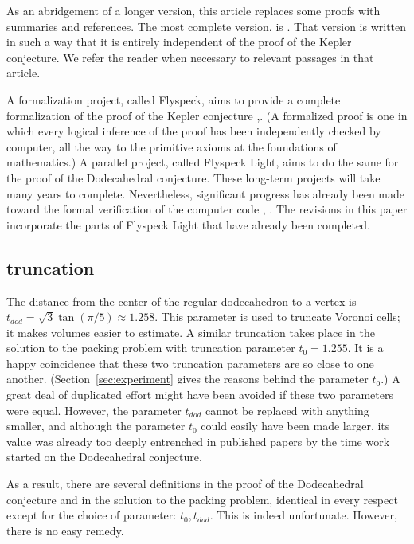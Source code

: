 As an abridgement of a longer version, this article replaces 
some proofs with summaries and references.  The most complete version.
is \cite{arx}.  That version is written in such a way that it is
entirely independent of the proof of the Kepler conjecture. 
We refer the reader when necessary to relevant
passages in that article.

A formalization project, called Flyspeck, aims to
provide a complete formalization of the proof of the Kepler conjecture \cite{fly},\cite{Fl}.  (A formalized proof is one in which every logical inference of the proof has been independently checked by computer, all the way to the primitive axioms at the foundations of mathematics.)
A parallel project, called Flyspeck Light, aims to do the same
for the proof of the Dodecahedral conjecture.  These long-term projects
will take many years to complete.  Nevertheless, significant progress
has already been made toward the formal verification of the computer
code \cite{BN}, \cite{Ob}.   The revisions in this paper 
incorporate the parts of Flyspeck Light that have
already been completed.

\subsection{truncation}

The distance from the center of the regular dodecahedron to a vertex is
$t_{dod}=\sqrt{3}\tan(\pi/5)\approx 1.258$.   This parameter is used to truncate
Voronoi cells; it makes  volumes easier to estimate.  A similar truncation
takes place in the solution to the packing problem with truncation parameter
$t_0 = 1.255$.  It is a happy coincidence that these two truncation parameters 
are so close to one another.  (Section~\ref{sec:experiment} 
gives the reasons behind the parameter $t_0$.)  A great deal of duplicated effort
might have been avoided if these two parameters were equal.  However, the parameter
$t_{dod}$ cannot be replaced with anything smaller, 
and although the parameter $t_0$ could 
easily have been made larger, 
its value was already too deeply entrenched in published papers 
by the time  work started
on the Dodecahedral conjecture.  

As a result, there are several definitions in the proof of the Dodecahedral conjecture
and in the solution to the packing problem, identical in every respect except
for the choice of parameter: $t_0,t_{dod}$.  This is indeed unfortunate.  However,
there is no easy remedy. 



